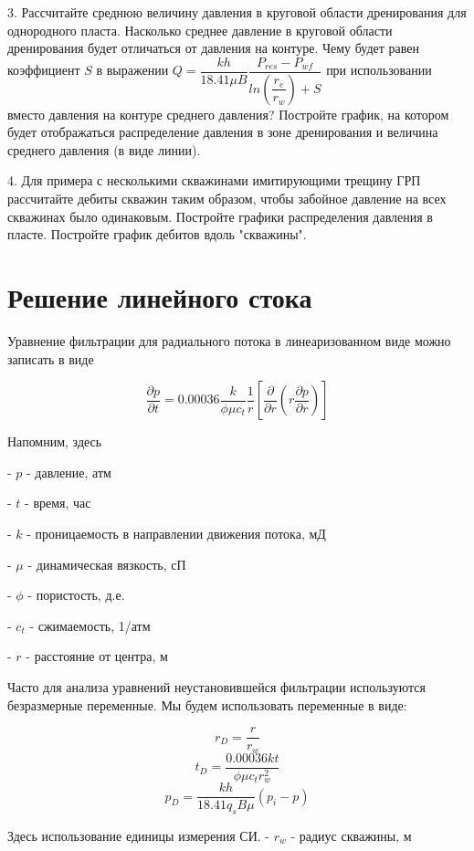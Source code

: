 \documentclass[oneside, openany]{memoir}
\begin{document}
	3. Рассчитайте среднюю величину давления в круговой области дренирования для однородного пласта. Насколько среднее давление в круговой области дренирования будет отличаться от давления на контуре. Чему будет равен коэффициент $S$ в выражении  $Q=\dfrac{kh}{18.41\mu B} \dfrac{P_{res}-P_{wf}}{ln(\dfrac{r_e}{r_w})+S}$ при использовании вместо давления на контуре среднего давления? Постройте график, на котором будет отображаться распределение давления в зоне дренирования и величина среднего давления (в виде линии).
	
	4. Для примера с несколькими скважинами имитирующими трещину ГРП рассчитайте дебиты скважин таким образом, чтобы забойное давление на всех скважинах было одинаковым. Постройте графики распределения давления в пласте. Постройте график дебитов вдоль "скважины".
	
	\section{Решение линейного стока}
	
	Уравнение фильтрации для радиального потока в линеаризованном виде можно записать в виде
	
	\begin{equation}
		\frac{\partial p}{\partial t} = 0.00036 \dfrac{k}{\phi \mu c_t} \dfrac{1}{r} \left[ \dfrac{\partial}{\partial r} \left( r \dfrac{ \partial p} {\partial r} \right) \right]		
	\end{equation} 

	
	Напомним, здесь
	
	- $p$ - давление, атм
	
	- $t$ - время, час
	
	- $k$ - проницаемость в направлении движения потока, мД
	
	- $\mu$ - динамическая вязкость, сП
	
	- $\phi$ - пористость, д.е.
	
	- $c_t$ - сжимаемость, 1/атм
	
	- $r$ - расстояние от центра, м
	
	Часто для анализа уравнений неустановившейся фильтрации используются безразмерные переменные. Мы будем использовать переменные в виде:
	
	$$ r_D = \frac{r}{r_w}  $$
	$$ t_D = \frac{0.00036 kt}{\phi \mu c_t r_w^2}  $$
	$$ p_D = \frac{kh}{ 18.41 q_s B \mu} \left( p_i - p \right)   $$
	
	Здесь использование единицы измерения СИ.
	- $r_w$ - радиус скважины, м
	
\end{document}
